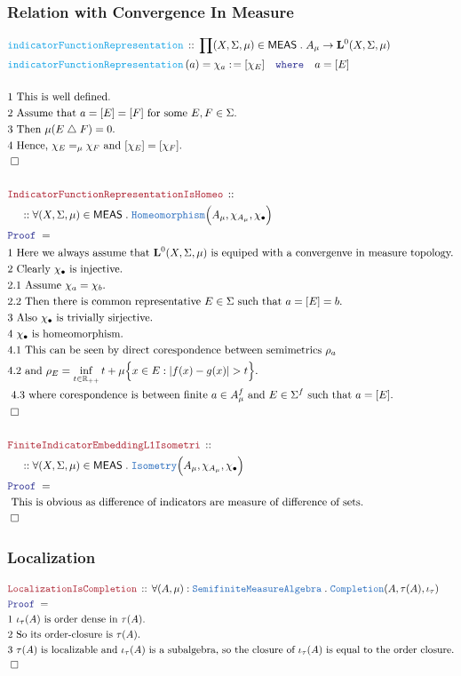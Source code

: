 \documentclass[12pt]{scrartcl}
\newcommand{\TYPE}[1]{\textcolor{NavyBlue}{\mathtt{#1}}}
\newcommand{\FUNC}[1]{\textcolor{Cerulean}{\mathtt{#1}}}
\newcommand{\LOGIC}[1]{\textcolor{Blue}{\mathtt{#1}}}
\newcommand{\THM}[1]{\textcolor{Maroon}{\mathtt{#1}}}
\renewcommand{\.}{\; . \;}
\newcommand{\de}{: \kern 0.1pc =}
\newcommand{\where}{\LOGIC{where}}
\newcommand{\Act}[1]{\left( #1 \right)}
\newcommand{\Theorem}[2]{& \THM{#1} \, :: \, #2 \\ & \Proof = \\ }
\newcommand{\DeclareFunc}[2]{& \FUNC{#1} \, :: \, #2 \\}
\newcommand{\DefineNamedFunc}[4]{&  \FUNC{#1}\Act{#2} = #3 \de #4 \\}
\newcommand{\NewLine}{\\ & \kern 1pc}
\newcommand{\Page}[1]{ \begin{align*} #1 \end{align*}   }
\newcommand{\Reals}{\mathbb{R} }
\newcommand{\du}{\; \triangle \;}
\newcommand{\QED}{\; \square}
\newcommand{\EndProof}{& \QED \\}
\newcommand{\Proof}{\LOGIC{Proof} \; }
\newcommand{\Explain}[1]{& \text{#1.} \\}
\newcommand{\ExplainFurther}[1]{& \text{#1} \\}
\newcommand{\Semifinite}{\TYPE{Semifinite}}
\newcommand{\MEAS}{\mathsf{MEAS}}
\newcommand{\MA}{\TYPE{MeasureAlgebra}}
\newcommand{\Lp}[1]{\mathbf{L}^{#1}}
\begin{document}
\subsubsection{Relation with Convergence In Measure}
\Page{
	\DeclareFunc{indicatorFunctionRepresentation}
	{
		\prod (X,\Sigma,\mu) \in \MEAS \. A_\mu \to \Lp{0}(X,\Sigma,\mu)
	}
	\DefineNamedFunc{indicatorFunctionRepresentation}{a}{\chi_a}
	{
		[ \chi_E  ] \quad \where \quad a = [E]
	}
	\\
	\Explain{1 This is well defined}
	\Explain{2 Assume that $a = [E] = [F]$ for some $E,F \in \Sigma$}
	\Explain{3 Then $\mu(E \du F) = 0$}
	\Explain{4 Hence, $\chi_E = _\mu \chi_F$ and $[\chi_E] = [\chi_F]$}
	\EndProof
	\\
	\Theorem{IndicatorFunctionRepresentationIsHomeo}
	{
		\NewLine ::		
		\forall (X,\Sigma,\mu) \in \MEAS \.
		\TYPE{Homeomorphism}\Big(A_\mu,\chi_{A_\mu},\chi_\bullet\Big)
	}
	\Explain{1 Here we always assume that $\Lp{0}(X,\Sigma,\mu)$ is equiped with 
		a convergenve in measure topology}
	\Explain{2  Clearly $\chi_\bullet$ is injective}
	\Explain{2.1 Assume $\chi_a = \chi_b$}
	\Explain{2.2 Then there is common representative $E \in \Sigma$ such that $a = [E] = b$}
	\Explain{3 Also $\chi_\bullet$ is trivially sirjective}
	\Explain{4 $\chi_\bullet$ is homeomorphism}
	\ExplainFurther{4.1 This can be seen by direct corespondence between semimetrics
		$\rho_a$} 
	\Explain{4.2 and $\rho_E = \inf_{t \in \Reals_{++}} t + \mu\Big\{ x \in E : |f(x) - g(x)| > t  \Big\}$}
	\Explain{ 4.3 where corespondence is between finite $a \in A^f_\mu$ and $E \in \Sigma^f$ such that 
		$a = [E]$}
	\EndProof
	\\
	\Theorem{FiniteIndicatorEmbeddingL1Isometri}
	{	
		\NewLine ::
		\forall (X,\Sigma,\mu) \in \MEAS \.
		\TYPE{Isometry}\Big(A_\mu,\chi_{A_\mu},\chi_\bullet\Big)
	}
	\Explain{ This is obvious as difference of indicators are measure of difference of sets}
	\EndProof
}
\newpage
\subsubsection{Localization}
\Page{
	\Theorem{LocalizationIsCompletion}
	{
		\forall (A,\mu) : \Semifinite\MA \.
		\TYPE{Completion}(A,\tau(A),\iota_\tau) 
	}
	\Explain{1 $\iota_\tau(A)$ is order dense in $\tau(A)$}
	\Explain{2 So its order-closure is $\tau(A)$}
	\Explain{3 $\tau(A)$ is localizable and $\iota_\tau(A)$ is a subalgebra, 
		so the closure of $\iota_\tau(A)$ is equal to the order closure}
	\EndProof
}
\newpage
\end{document}
